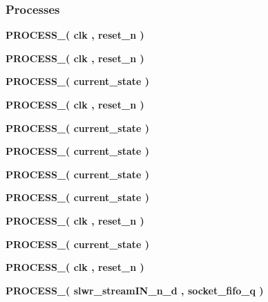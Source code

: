 \subsubsection*{Processes}
 \begin{DoxyCompactItemize}
\item 
{\bf P\+R\+O\+C\+E\+S\+S\+\_}{\bfseries  ( {\bfseries {\bfseries {\bf clk}} \textcolor{vhdlchar}{ }} , {\bfseries {\bfseries {\bf reset\+\_\+n}} \textcolor{vhdlchar}{ }} )}
\item 
{\bf P\+R\+O\+C\+E\+S\+S\+\_}{\bfseries  ( {\bfseries {\bfseries {\bf clk}} \textcolor{vhdlchar}{ }} , {\bfseries {\bfseries {\bf reset\+\_\+n}} \textcolor{vhdlchar}{ }} )}
\item 
{\bf P\+R\+O\+C\+E\+S\+S\+\_}{\bfseries  ( {\bfseries {\bfseries {\bf current\+\_\+state}} \textcolor{vhdlchar}{ }} )}
\item 
{\bf P\+R\+O\+C\+E\+S\+S\+\_}{\bfseries  ( {\bfseries {\bfseries {\bf clk}} \textcolor{vhdlchar}{ }} , {\bfseries {\bfseries {\bf reset\+\_\+n}} \textcolor{vhdlchar}{ }} )}
\item 
{\bf P\+R\+O\+C\+E\+S\+S\+\_}{\bfseries  ( {\bfseries {\bfseries {\bf current\+\_\+state}} \textcolor{vhdlchar}{ }} )}
\item 
{\bf P\+R\+O\+C\+E\+S\+S\+\_}{\bfseries  ( {\bfseries {\bfseries {\bf current\+\_\+state}} \textcolor{vhdlchar}{ }} )}
\item 
{\bf P\+R\+O\+C\+E\+S\+S\+\_}{\bfseries  ( {\bfseries {\bfseries {\bf current\+\_\+state}} \textcolor{vhdlchar}{ }} )}
\item 
{\bf P\+R\+O\+C\+E\+S\+S\+\_}{\bfseries  ( {\bfseries {\bfseries {\bf current\+\_\+state}} \textcolor{vhdlchar}{ }} )}
\item 
{\bf P\+R\+O\+C\+E\+S\+S\+\_}{\bfseries  ( {\bfseries {\bfseries {\bf clk}} \textcolor{vhdlchar}{ }} , {\bfseries {\bfseries {\bf reset\+\_\+n}} \textcolor{vhdlchar}{ }} )}
\item 
{\bf P\+R\+O\+C\+E\+S\+S\+\_}{\bfseries  ( {\bfseries {\bfseries {\bf current\+\_\+state}} \textcolor{vhdlchar}{ }} )}
\item 
{\bf P\+R\+O\+C\+E\+S\+S\+\_}{\bfseries  ( {\bfseries {\bfseries {\bf clk}} \textcolor{vhdlchar}{ }} , {\bfseries {\bfseries {\bf reset\+\_\+n}} \textcolor{vhdlchar}{ }} )}
\item 
{\bf P\+R\+O\+C\+E\+S\+S\+\_}{\bfseries  ( {\bfseries {\bfseries {\bf slwr\+\_\+stream\+I\+N\+\_\+n\+\_\+d}} \textcolor{vhdlchar}{ }} , {\bfseries {\bfseries {\bf socket\+\_\+fifo\+\_\+q}} \textcolor{vhdlchar}{ }} )}

\end{DoxyCompactItemize}
